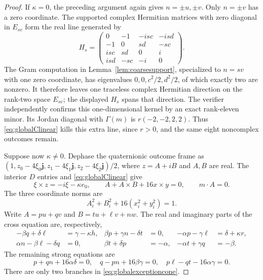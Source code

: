 \documentclass[11pt]{article}
\begin{document}
\begin{proof}
If $\kappa=0$, the preceding argument again gives $n=\pm u,\pm v$.
Only $n=\pm v$ has a zero coordinate. The supported complex Hermitian
matrices with zero diagonal in $E_{sv}$ form the real line generated by
\[
 H_s=\begin{pmatrix}
 0&-1&-isc&-isd\\-1&0&sd&-sc\\
 isc&sd&0&i\\isd&-sc&-i&0
 \end{pmatrix}.
\]
The Gram computation in Lemma~\ref{lem:coarsesupport}, specialized
to $n=sv$ with one zero coordinate, has eigenvalues
$0,0,c^2/2,d^2/2$, of which exactly two are nonzero.
It therefore leaves one traceless complex Hermitian direction on the
rank-two space $E_{sv}$; the displayed $H_s$ spans that direction.
The verifier independently confirms this one-dimensional kernel by an
exact rank-eleven minor.
Its Jordan diagonal with $\Gamma(m)$ is $r(-2,-2,2,2)$.
Thus \eqref{eq:globalClinear} kills this extra line, since $r>0$,
and the same eight noncomplex outcomes remain.

Suppose now $\kappa\ne0$. Dephase the quaternionic outcome frame as
$(1,z_0-4\xi_0\mathbf j,z_1-4\xi_1\mathbf j,
 z_2-4\xi_2\mathbf j)/2$, where $z=A+iB$ and $A,B$ are real.
The interior $D$ entries and \eqref{eq:globalClinear} give
\begin{equation}\label{eq:globalframeequations}
 \xi\times z=-i\xi-\kappa e_0,\qquad
 A+A\times B+16x\times y=0,\qquad m\cdot A=0.
\end{equation}
The three coordinate norms are
\begin{equation}\label{eq:globalframenorms}
 A_i^2+B_i^2+16(x_i^2+y_i^2)=1.
\end{equation}
Write $A=p u+q v$ and $B=t u+\ell v+n w$.
The real and imaginary parts of the cross equation are, respectively,
\begin{align*}
 -\beta q+\delta\ell&=\gamma-\kappa h,&
 \beta p+\gamma n-\delta t&=0,&
 -\alpha p-\gamma\ell&=\delta+\kappa r,\\
 \alpha n-\beta\ell-\delta q&=0,&
 \beta t+\delta p&=-\alpha,&
 -\alpha t+\gamma q&=-\beta.
\end{align*}
The remaining strong equations are
\begin{equation}\label{eq:globalstrongcoordinates}
 p+qn+16\alpha\delta=0,\quad
 q-pn+16\beta\gamma=0,\quad
 p\ell-qt-16\alpha\gamma=0.
\end{equation}
There are only two branches in \eqref{eq:globalexceptioncone}.


\end{proof}
\end{document}
